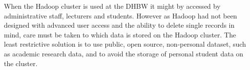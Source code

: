 When the Hadoop cluster is used at the \ac{DHBW} it might by accessed by administrative staff, lecturers and students.
However as Hadoop had not been designed with advanced user access 
and the ability to delete single records in mind,  
care must be taken to which data is stored on the Hadoop cluster.
The least restrictive solution is to use public, open source, non-personal dataset, such as academic research data, and to avoid the storage of personal student data on the cluster. 
